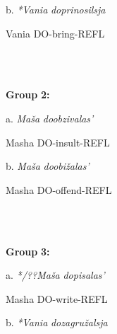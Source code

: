 \documentclass[output=paper,modfonts, nonflat]{langsci/langscibook}
\begin{document}
\begin{styleinnerExample}
  b.  \textit{*Vania}   \textit{doprinosilsja} 
\end{styleinnerExample}

\begin{styleinnerExample}
      Vania   DO-bring-REFL
\end{styleinnerExample}

\begin{styleinnerExample}
\ea%
    \label{ex:key:45}
    \gll\\
        \\
    \glt
    \z

          \textbf{Group} \textbf{2:}
\end{styleinnerExample}

\begin{styleinnerExample}
  a.  \textit{Maša}   \textit{doobzivalas’} 
\end{styleinnerExample}

\begin{styleinnerExample}
    Masha DO-insult-REFL\\\end{styleinnerExample}

\begin{styleinnerExample}
  b.  \textit{Maša}  \textit{doobižalas’} 
\end{styleinnerExample}

\begin{styleinnerExample}
    Masha DO-offend-REFL
\end{styleinnerExample}

\begin{styleinnerExample}
\ea%
    \label{ex:key:46}
    \gll\\
        \\
    \glt
    \z

          \textbf{Group} \textbf{3:}
\end{styleinnerExample}

\begin{styleinnerExample}
  a.  \textit{*/??Maša} \textit{dopisalas’}  
\end{styleinnerExample}

\begin{styleinnerExample}
    Masha DO-write-REFL\\\end{styleinnerExample}

\begin{styleinnerExample}
  b.  \textit{*Vania} \textit{dozagružalsja} 
\end{styleinnerExample}
\end{document}
